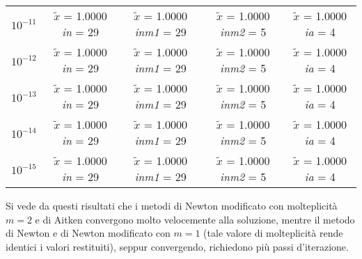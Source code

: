 \begin{center}
\begin{tabular}{|c|c|c|c|c|}
			$10^{-11}$ & $\tilde{x}$ = 1.0000 \quad \textit{in} = 29 & $\tilde{x}$ = 1.0000 \quad \textit{inm1} = 29 & $\tilde{x}$ = 1.0000 \quad \textit{inm2} = 5 & $\tilde{x}$ = 1.0000 \quad \textit{ia} = 4\\
			$10^{-12}$ & $\tilde{x}$ = 1.0000 \quad \textit{in} = 29 & $\tilde{x}$ = 1.0000 \quad \textit{inm1} = 29 & $\tilde{x}$ = 1.0000 \quad \textit{inm2} = 5 & $\tilde{x}$ = 1.0000 \quad \textit{ia} = 4\\
			$10^{-13}$ & $\tilde{x}$ = 1.0000 \quad \textit{in} = 29 & $\tilde{x}$ = 1.0000 \quad \textit{inm1} = 29 & $\tilde{x}$ = 1.0000 \quad \textit{inm2} = 5 & $\tilde{x}$ = 1.0000 \quad \textit{ia} = 4\\
			$10^{-14}$ & $\tilde{x}$ = 1.0000 \quad \textit{in} = 29 & $\tilde{x}$ = 1.0000 \quad \textit{inm1} = 29 & $\tilde{x}$ = 1.0000 \quad \textit{inm2} = 5 & $\tilde{x}$ = 1.0000 \quad \textit{ia} = 4\\
			$10^{-15}$ & $\tilde{x}$ = 1.0000 \quad \textit{in} = 29 & $\tilde{x}$ = 1.0000 \quad \textit{inm1} = 29 & $\tilde{x}$ = 1.0000 \quad \textit{inm2} = 5 & $\tilde{x}$ = 1.0000 \quad \textit{ia} = 4\\
		\hline
	\end{tabular}
\end{center}
Si vede da questi risultati che i metodi di Newton modificato con molteplicità $m=2$ e di Aitken convergono molto velocemente alla soluzione, mentre il metodo di Newton e di Newton modificato con $m=1$ (tale valore di molteplicità rende identici i valori restituiti), seppur convergendo, richiedono più passi d'iterazione.